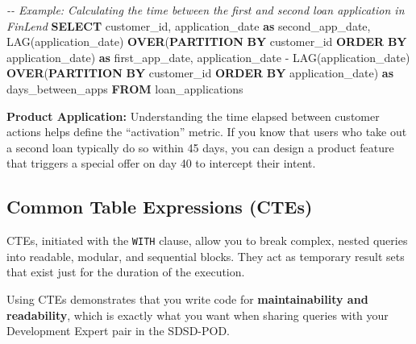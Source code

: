 \documentclass[
  11pt,
  openany,
  oneside]{book}
\newenvironment{Shaded}{}{}
\newcommand{\CommentTok}[1]{\textcolor[rgb]{0.38,0.63,0.69}{\textit{#1}}}
\newcommand{\FunctionTok}[1]{\textcolor[rgb]{0.02,0.16,0.49}{#1}}
\newcommand{\KeywordTok}[1]{\textcolor[rgb]{0.00,0.44,0.13}{\textbf{#1}}}
\newcommand{\NormalTok}[1]{#1}
\newcommand{\OperatorTok}[1]{\textcolor[rgb]{0.40,0.40,0.40}{#1}}
\begin{document}
\begin{Shaded}
\begin{Highlighting}[]
\CommentTok{{-}{-} Example: Calculating the time between the first and second loan application in FinLend}
\KeywordTok{SELECT} 
\NormalTok{    customer\_id,}
\NormalTok{    application\_date }\KeywordTok{as}\NormalTok{ second\_app\_date,}
    \FunctionTok{LAG}\NormalTok{(application\_date) }\KeywordTok{OVER}\NormalTok{(}\KeywordTok{PARTITION} \KeywordTok{BY}\NormalTok{ customer\_id }\KeywordTok{ORDER} \KeywordTok{BY}\NormalTok{ application\_date) }\KeywordTok{as}\NormalTok{ first\_app\_date,}
\NormalTok{    application\_date }\OperatorTok{{-}} \FunctionTok{LAG}\NormalTok{(application\_date) }\KeywordTok{OVER}\NormalTok{(}\KeywordTok{PARTITION} \KeywordTok{BY}\NormalTok{ customer\_id }\KeywordTok{ORDER} \KeywordTok{BY}\NormalTok{ application\_date) }\KeywordTok{as}\NormalTok{ days\_between\_apps}
\KeywordTok{FROM}\NormalTok{ loan\_applications}
\end{Highlighting}
\end{Shaded}

\textbf{Product Application:} Understanding the time elapsed between
customer actions helps define the ``activation'' metric. If you know
that users who take out a second loan typically do so within 45 days,
you can design a product feature that triggers a special offer on day 40
to intercept their intent.

\subsection{Common Table Expressions
(CTEs)}\label{common-table-expressions-ctes}

CTEs, initiated with the \texttt{WITH} clause, allow you to break
complex, nested queries into readable, modular, and sequential blocks.
They act as temporary result sets that exist just for the duration of
the execution.

Using CTEs demonstrates that you write code for \textbf{maintainability
and readability}, which is exactly what you want when sharing queries
with your Development Expert pair in the SDSD-POD.
\end{document}
